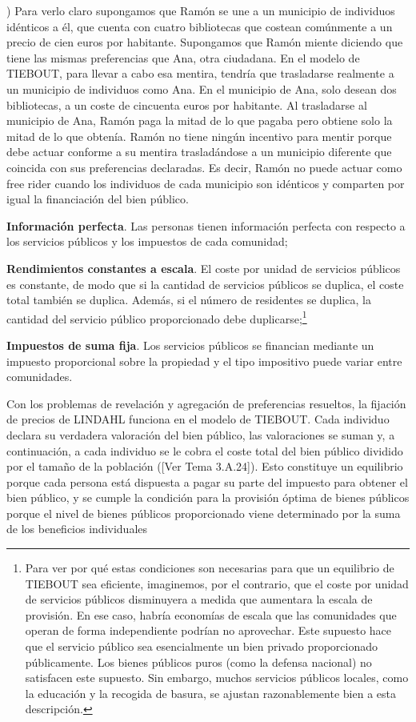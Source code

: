 \documentclass[10pt,a4paper]{article}
\newcounter{alphaitem}
\newenvironment{la}
      {\begin{list}{\alph{alphaitem})}{%
          \usecounter{alphaitem}%
          \setlength{\leftmargin}{1cm}%
          \setlength{\parskip}{3pt}%
          \setlength{\itemsep}{0pt}%
          \setlength{\parsep}{0pt}%
      }}
      {\end{list}}
\newcommand{\authorfont}[1]{{\fontfamily{EBGaramond-TLF}\selectfont #1}}
\begin{document}
\begin{la}
{    Para verlo claro supongamos que Ramón se une a un municipio de individuos idénticos a él, que cuenta con cuatro bibliotecas que costean comúnmente a un precio de cien euros por habitante. Supongamos que Ramón miente diciendo que tiene las mismas preferencias que Ana, otra ciudadana. En el modelo de TIEBOUT, para llevar a cabo esa mentira, tendría que trasladarse realmente a un municipio de individuos como Ana. En el municipio de Ana, solo desean dos bibliotecas, a un coste de cincuenta euros por habitante. Al trasladarse al municipio de Ana, Ramón paga la mitad de lo que pagaba pero obtiene solo la mitad de lo que obtenía. Ramón no tiene ningún incentivo para mentir porque debe actuar conforme a su mentira trasladándose a un municipio diferente que coincida con sus preferencias declaradas. Es decir, Ramón no puede actuar como free rider cuando los individuos de cada municipio son idénticos y comparten por igual la financiación del bien público.
    }
    \item \textbf{Información perfecta}. Las personas tienen información perfecta con respecto a los servicios públicos y los impuestos de cada comunidad;
    \item \textbf{Rendimientos constantes a escala}. El coste por unidad de servicios públicos es constante, de modo que si la cantidad de servicios públicos se duplica, el coste total también se duplica. Además, si el número de residentes se duplica, la cantidad del servicio público proporcionado debe duplicarse;\footnote{%
        Para ver por qué estas condiciones son necesarias para que un equilibrio de TIEBOUT sea eficiente, imaginemos, por el contrario, que el coste por unidad de servicios públicos disminuyera a medida que aumentara la escala de provisión. En ese caso, habría economías de escala que las comunidades que operan de forma independiente podrían no aprovechar. Este supuesto hace que el servicio público sea esencialmente un bien privado proporcionado públicamente. Los bienes públicos puros (como la defensa nacional) no satisfacen este supuesto. Sin embargo, muchos servicios públicos locales, como la educación y la recogida de basura, se ajustan razonablemente bien a esta descripción.
    }
    \item \textbf{Impuestos de suma fija}. Los servicios públicos se financian mediante un impuesto proporcional sobre la propiedad y el tipo impositivo puede variar entre comunidades.
\end{la}

Con los problemas de revelación y agregación de preferencias resueltos, la fijación de precios de LINDAHL funciona en el modelo de TIEBOUT. Cada individuo declara su verdadera valoración del bien público, las valoraciones se suman y, a continuación, a cada individuo se le cobra el coste total del bien público dividido por el tamaño de la población ([\authorfont{Ver Tema 3.A.24}]). Esto constituye un equilibrio porque cada persona está dispuesta a pagar su parte del impuesto para obtener el bien público, y se cumple la condición para la provisión óptima de bienes públicos porque el nivel de bienes públicos proporcionado viene determinado por la suma de los beneficios individuales
\end{document}
